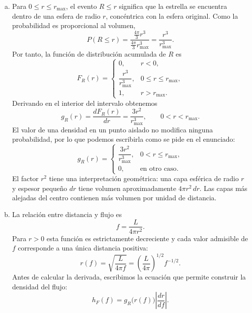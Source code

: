 \documentclass[a4paper]{article}
\begin{document}
\begin{enumerate}[a)]
\item Para $0\le r\le r_{\max}$, el evento $R\le r$ significa que la estrella se encuentra dentro de una esfera de radio $r$, concéntrica con la esfera original. Como la probabilidad es proporcional al volumen,
$$
P(R\le r)
=\frac{\frac{4\pi}{3}r^3}{\frac{4\pi}{3}r_{\max}^3}
=\frac{r^3}{r_{\max}^3}.
$$
Por tanto, la función de distribución acumulada de $R$ es
$$
F_R(r)=
\begin{cases}
0, & r<0,\\[1mm]
\dfrac{r^3}{r_{\max}^3}, & 0\le r\le r_{\max},\\[2mm]
1, & r>r_{\max}.
\end{cases}
$$
Derivando en el interior del intervalo obtenemos
$$
g_R(r)=\frac{dF_R(r)}{dr}=\frac{3r^2}{r_{\max}^3},
\qquad 0<r<r_{\max}.
$$
El valor de una densidad en un punto aislado no modifica ninguna probabilidad, por lo que podemos escribirla como se pide en el enunciado:
$$
\boxed{
g_R(r)=
\begin{cases}
\dfrac{3r^2}{r_{\max}^3}, & 0<r\le r_{\max},\\[2mm]
0, & \text{en otro caso}.
\end{cases}}
$$
El factor $r^2$ tiene una interpretación geométrica: una capa esférica de radio $r$ y espesor pequeño $dr$ tiene volumen aproximadamente $4\pi r^2\,dr$. Las capas más alejadas del centro contienen más volumen por unidad de distancia.



\item La relación entre distancia y flujo es
$$
f=\frac{L}{4\pi r^2}.
$$
Para $r>0$ esta función es estrictamente decreciente y cada valor admisible de $f$ corresponde a una única distancia positiva:
$$
r(f)=\sqrt{\frac{L}{4\pi f}}
=\left(\frac{L}{4\pi}\right)^{1/2}f^{-1/2}.
$$
Antes de calcular la derivada, escribimos la ecuación que permite construir la densidad del flujo:
$$
h_F(f)=g_R\bigl(r(f)\bigr)\left|\frac{dr}{df}\right|.
$$




\end{enumerate}
\end{document}
